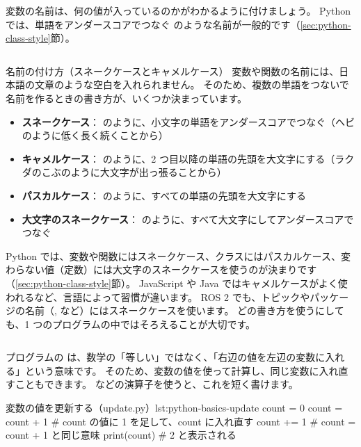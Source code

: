 
変数の名前は、何の値が入っているのかがわかるように付けましょう。
Python では、単語をアンダースコアでつなぐ  のような名前が一般的です（\ref{sec:python-class-style}節）。

\begin{column}{名前の付け方（スネークケースとキャメルケース）}
  変数や関数の名前には、日本語の文章のような空白を入れられません。
  そのため、複数の単語をつないで名前を作るときの書き方が、いくつか決まっています。
  \begin{itemize}
    \item \textbf{スネークケース}： のように、小文字の単語をアンダースコアでつなぐ（ヘビのように低く長く続くことから）
    \item \textbf{キャメルケース}： のように、2 つ目以降の単語の先頭を大文字にする（ラクダのこぶのように大文字が出っ張ることから）
    \item \textbf{パスカルケース}： のように、すべての単語の先頭を大文字にする
    \item \textbf{大文字のスネークケース}： のように、すべて大文字にしてアンダースコアでつなぐ
  \end{itemize}
  Python では、変数や関数にはスネークケース、クラスにはパスカルケース、変わらない値（定数）には大文字のスネークケースを使うのが決まりです（\ref{sec:python-class-style}節）。
  JavaScript や Java ではキャメルケースがよく使われるなど、言語によって習慣が違います。
  ROS 2 でも、トピックやパッケージの名前（,  など）にはスネークケースを使います。
  どの書き方を使うにしても、1 つのプログラムの中ではそろえることが大切です。
\end{column}

プログラムの \cmd{=} は、数学の「等しい」ではなく、「右辺の値を左辺の変数に入れる」という意味です。
そのため、変数の値を使って計算し、同じ変数に入れ直すこともできます。
\cmd{+=} などの演算子を使うと、これを短く書けます。

\begin{codelisting}[style=python]{変数の値を更新する（update.py）}{lst:python-basics-update}
count = 0
count = count + 1   # count の値に 1 を足して、count に入れ直す
count += 1          # count = count + 1 と同じ意味
print(count)        # 2 と表示される
\end{codelisting}

